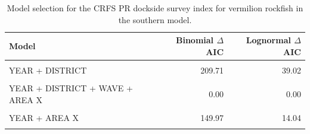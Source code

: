 \documentclass[11pt,
  english,
]{article}
\begin{document}
\begin{table}

\caption{\label{tab:tab-model-select-crfspr}Model selection for the CRFS PR dockside survey index for vermilion rockfish in the southern model.}
\centering
\begin{tabular}[t]{lrr}
\toprule
Model & Binomial $\Delta$AIC & Lognormal $\Delta$AIC\\
\midrule
\cellcolor{gray!6}{1} & \cellcolor{gray!6}{328.75} & \cellcolor{gray!6}{168.29}\\
YEAR + DISTRICT & 209.71 & 39.02\\
\cellcolor{gray!6}{YEAR + DISTRICT + WAVE} & \cellcolor{gray!6}{65.11} & \cellcolor{gray!6}{29.58}\\
YEAR + DISTRICT + WAVE + AREA X & 0.00 & 0.00\\
\cellcolor{gray!6}{YEAR + WAVE + AREA X} & \cellcolor{gray!6}{2.48} & \cellcolor{gray!6}{5.11}\\
\addlinespace
YEAR + AREA X & 149.97 & 14.04\\
\cellcolor{gray!6}{YEAR + DISTRICT + AREA X} & \cellcolor{gray!6}{145.89} & \cellcolor{gray!6}{9.79}\\
\bottomrule
\end{tabular}
\end{table}

\FloatBarrier
\end{document}
